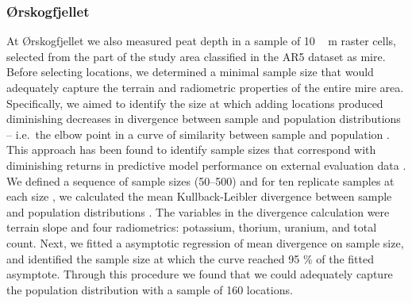 \documentclass[soil, manuscript]{copernicus}
\begin{document}
\subsubsection{Ørskogfjellet}

At Ørskogfjellet we also measured peat depth in a sample of \unit{10\,m} raster cells, selected from the part of the study area classified in the AR5 dataset as mire.
Before selecting locations, we determined a minimal sample size that would adequately capture the terrain and radiometric properties of the entire mire area.
Specifically, we aimed to identify the size at which adding locations produced diminishing decreases in divergence between sample and population distributions -- i.e.~the elbow point in a curve of similarity between sample and population \citep{maloneMethodsImproveUtility2019}.
This approach has been found to identify sample sizes that correspond with diminishing returns in predictive model performance on external evaluation data \citep{sauretteDivergenceMetricsDetermining2023}.
We defined a sequence of sample sizes (50--500) and for ten replicate samples at each size \citep[drawn by conditioned latin hypercube sampling,][]{minasnyConditionedLatinHypercube2006, roudierClhsPackageConditioned2011}, we calculated the mean Kullback-Leibler divergence between sample and population distributions \citep{maloneMethodsImproveUtility2019, sauretteDivergenceMetricsDetermining2023}.
The variables in the divergence calculation were terrain slope and four radiometrics: potassium, thorium, uranium, and total count.
Next, we fitted a asymptotic regression of mean divergence on sample size, and identified the sample size at which the curve reached 95 \% of the fitted asymptote.
Through this procedure we found that we could adequately capture the population distribution with a sample of 160 locations.
\end{document}
